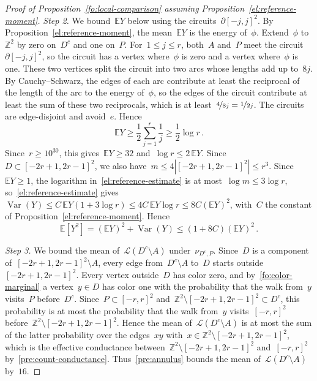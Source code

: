 \documentclass[11pt]{amsart}
\numberwithin{equation}{section}
\newcommand{\Z}{\mathbb Z}
\newcommand{\EE}{\mathbb E}
\newcommand{\nf}{\nicefrac}
\newcommand{\cL}{\mathscr{L}}
\begin{document}
\begin{proof}[Proof of Proposition~\ref{fo:local-comparison} assuming Proposition~\ref{el:reference-moment}]
\emph{Step 2.} We bound~$\EE Y$ below using the circuits~$\partial[-j,j]^2$. By Proposition~\ref{el:reference-moment}, the mean~$\EE Y$ is the energy of~$\phi$. Extend~$\phi$ to~$\Z^2$ by zero on~$D^c$ and one on~$P$. For~$1\leq j\leq r$, both~$A$ and~$P$ meet the circuit~$\partial[-j,j]^2$, so the circuit has a vertex where~$\phi$ is zero and a vertex where~$\phi$ is one. These two vertices split the circuit into two arcs whose lengths add up to~$8j$. By Cauchy--Schwarz, the edges of each arc contribute at least the reciprocal of the length of the arc to the energy of~$\phi$, so the edges of the circuit contribute at least the sum of these two reciprocals, which is at least~$\nf4{8j}=\nf1{2j}$. The circuits are edge-disjoint and avoid~$e$. Hence
\begin{equation*}
\EE Y\geq\frac12\sum_{j=1}^r\frac1j\geq\frac12\log r\,.
\end{equation*}
Since~$r\geq10^{30}$, this gives~$\EE Y\geq32$ and~$\log r\leq2\,\EE Y$. Since~$D\subset [-2r+1,2r-1]^2$, we also have~$m\leq4|[-2r+1,2r-1]^2|\leq r^3$. Since~$\EE Y\geq1$, the logarithm in~\eqref{el:reference-estimate} is at most~$\log m\leq3\log r$, so~\eqref{el:reference-estimate} gives~$\operatorname{Var}(Y)\leq C\,\EE Y(1+3\log r)\leq4C\,\EE Y\log r\leq8C(\EE Y)^2$, with~$C$ the constant of Proposition~\ref{el:reference-moment}. Hence
\begin{equation*}
\EE[Y^2]=(\EE Y)^2+\operatorname{Var}(Y)\leq(1+8C)(\EE Y)^2\,.
\end{equation*}

\emph{Step 3.} We bound the mean of~$\cL(D^c\setminus A)$ under~$\nu_{D^c,P}$. Since~$D$ is a component of~$[-2r+1,2r-1]^2\setminus A$, every edge from~$D^c\setminus A$ to~$D$ starts outside~$[-2r+1,2r-1]^2$. Every vertex outside~$D$ has color zero, and by~\eqref{fo:color-marginal} a vertex~$y\in D$ has color one with the probability that the walk from~$y$ visits~$P$ before~$D^c$. Since~$P\subset [-r,r]^2$ and~$\Z^2\setminus [-2r+1,2r-1]^2\subset D^c$, this probability is at most the probability that the walk from~$y$ visits~$[-r,r]^2$ before~$\Z^2\setminus [-2r+1,2r-1]^2$. Hence the mean of~$\cL(D^c\setminus A)$ is at most the sum of the latter probability over the edges~$xy$ with~$x\in\Z^2\setminus [-2r+1,2r-1]^2$, which is the effective conductance between~$\Z^2\setminus [-2r+1,2r-1]^2$ and~$[-r,r]^2$ by~\eqref{pre:count-conductance}. Thus~\eqref{pre:annulus} bounds the mean of~$\cL(D^c\setminus A)$ by~$16$.


\end{proof}
\end{document}
